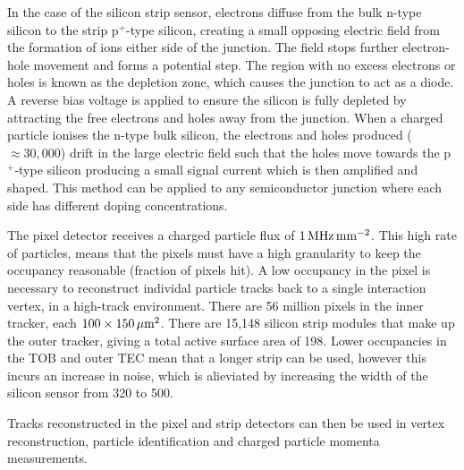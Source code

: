 In the case of the silicon strip sensor, electrons diffuse from the bulk n-type silicon to the strip p$^{+}$-type silicon, creating a small opposing electric field from the formation of ions either side of the \pnjunc{} junction.
The field stops further electron-hole movement and forms a potential step.
The region with no excess electrons or holes is known as the depletion zone, which causes the junction to act as a diode.
A reverse bias voltage is applied to ensure the silicon is fully depleted by attracting the free electrons and holes away from the \pnjunc{} junction.
When a charged particle ionises the n-type bulk silicon, the electrons and holes produced ($\approx 30,000$) drift in the large electric field such that the holes move towards the p$^{+}$-type silicon producing a small signal current which is then amplified and shaped.
This method can be applied to any semiconductor junction where each side has different doping concentrations.

The pixel detector receives a charged particle flux of $1\,\text{MHz}\,\text{mm}^{-2}$. This high rate of particles, means that the pixels must have a high granularity to keep the occupancy reasonable (fraction of pixels hit).
A low occupancy in the pixel is necessary to reconstruct individal particle tracks back to a single interaction vertex, in a high-track environment.
There are 56 million pixels in the inner tracker, each $100\times150\,\mu\text{m}^2$.
There are 15,148 silicon strip modules that make up the outer tracker, giving a total active surface area of 198\msq{}. Lower occupancies in the TOB and outer TEC mean that a longer strip can be used, however this incurs an increase in noise, which is alieviated by increasing the width of the silicon sensor from 320\um{} to 500\um{}.

Tracks reconstructed in the pixel and strip detectors can then be used in vertex reconstruction, particle identification and charged particle momenta measurements.





